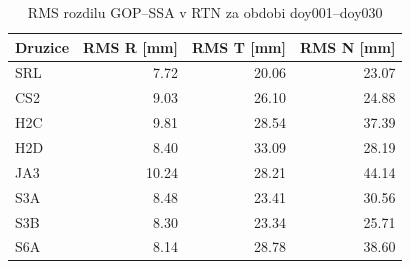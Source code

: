 \begin{table}[H]
\centering
\caption{RMS rozdilu GOP--SSA v RTN za obdobi doy001--doy030}
\label{tab:gop_vs_ssa_satellites_doy001-doy030_monthly_rms}
\begin{tabular}{lrrr}
\toprule
Druzice & RMS R [mm] & RMS T [mm] & RMS N [mm] \\
\midrule
SRL & 7.72 & 20.06 & 23.07 \\
CS2 & 9.03 & 26.10 & 24.88 \\
H2C & 9.81 & 28.54 & 37.39 \\
H2D & 8.40 & 33.09 & 28.19 \\
JA3 & 10.24 & 28.21 & 44.14 \\
S3A & 8.48 & 23.41 & 30.56 \\
S3B & 8.30 & 23.34 & 25.71 \\
S6A & 8.14 & 28.78 & 38.60 \\
\bottomrule
\end{tabular}
\end{table}
